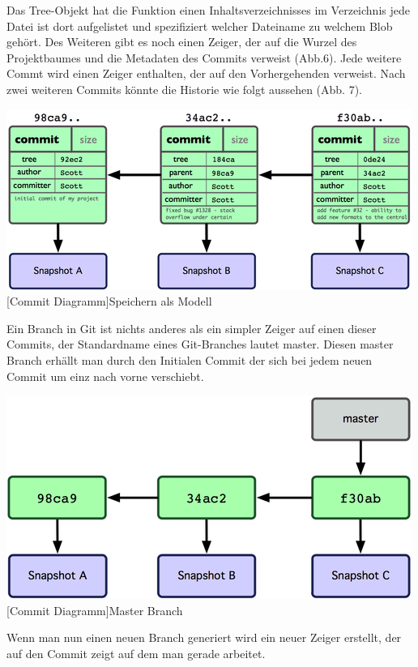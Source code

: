 \documentclass[12pt,a4paper,bibliography=totocnumbered,listof=totocnumbered]{scrartcl}
\begin{document}
Das Tree-Objekt hat die Funktion einen Inhaltsverzeichnisses im Verzeichnis jede Datei ist dort aufgelistet und  spezifiziert welcher Dateiname zu welchem Blob gehört. Des Weiteren gibt es noch einen  Zeiger, der auf die Wurzel des Projektbaumes und die Metadaten des Commits verweist (Abb.6).	 
Jede weitere Commt wird einen Zeiger enthalten, der auf den Vorhergehenden verweist. Nach zwei weiteren Commits könnte die Historie wie folgt aussehen (Abb. 7).

\vspace{1em}
\begin{minipage}{\linewidth}
	\centering
	\includegraphics[width=0.6\linewidth]{Bilder/commit.png}
	[Commit Diagramm]{Speichern als Modell\footnotemark }
	\label{fig:gitspeichern}
\end{minipage} 	

Ein Branch in Git ist nichts anderes als ein simpler Zeiger auf einen dieser Commits, der Standardname eines Git-Branches lautet master. Diesen master Branch erhällt man durch den Initialen Commit der sich bei jedem neuen Commit um einz nach vorne verschiebt.
\newline
\vspace{2em}
\begin{minipage}{\linewidth}
	\centering
	\includegraphics[width=0.6\linewidth]{Bilder/master.png}
	[Commit Diagramm]{Master Branch\footnotemark }
	\label{fig:gitspeichern}
\end{minipage} 
Wenn man nun einen neuen Branch generiert wird ein neuer Zeiger erstellt, der auf den Commit zeigt auf dem man gerade arbeitet.
\end{document}
